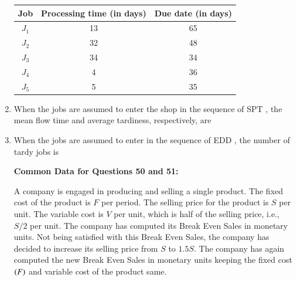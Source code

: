 \documentclass[journal,12pt,onecolumn]{IEEEtran}
\theoremstyle{remark}
\begin{document}
\begin{enumerate}
\vspace{1em}

\begin{center}
\begin{tabular}{|c|c|c|}
\hline
\textbf{Job} & \textbf{Processing time (in days)} & \textbf{Due date (in days)} \\
\hline
$J_1$ & 13 & 65 \\
\hline
$J_2$ & 32 & 48 \\
\hline
$J_3$ & 34 & 34 \\
\hline
$J_4$ & 4  & 36 \\
\hline
$J_5$ & 5  & 35 \\
\hline
\end{tabular}
\end{center}

\item When the jobs are assumed to enter the shop in the sequence of SPT , the mean flow time and average tardiness, respectively, are
\hfill{}
\begin{enumerate}
\end{enumerate}

\item When the jobs are assumed to enter in the sequence of EDD , the number of tardy jobs is
\hfill{}
\begin{enumerate}
\end{enumerate}
\noindent
\textbf{Common Data for Questions 50 and 51:}

\vspace{1em} %

\noindent
A company is engaged in producing and selling a single product. The fixed cost of the product is $F$ per period. The selling price for the product is $S$ per unit. The variable cost is $V$ per unit, which is half of the selling price, i.e., $S/2$ per unit. The company has computed its Break Even Sales in monetary units. Not being satisfied with this Break Even Sales, the company has decided to increase its selling price from $S$ to $1.5S$. The company has again computed the new Break Even Sales in monetary units keeping the fixed cost $\left(F\right)$ and variable cost  of the product same.



\end{enumerate}
\end{document}

